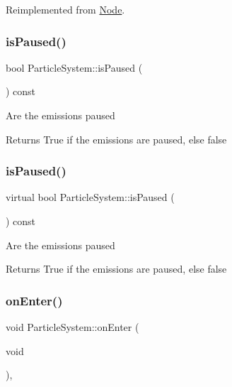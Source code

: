 Reimplemented from \hyperlink{classNode_ae6ce32d2088e2bb3426608334f1091c5}{Node}.

\mbox{\label{classParticleSystem_a330fdcb2d5d8e035e6955c8105c52659}} 
\subsubsection{\texorpdfstring{is\+Paused()}{isPaused()}\hspace{0.1cm}{\footnotesize\ttfamily [1/2]}}
{\footnotesize\ttfamily bool Particle\+System\+::is\+Paused (\begin{DoxyParamCaption}{ }\end{DoxyParamCaption}) const\hspace{0.3cm}{\ttfamily [virtual]}}

Are the emissions paused \begin{DoxyReturn}{Returns}
True if the emissions are paused, else false 
\end{DoxyReturn}
\mbox{\label{classParticleSystem_a5a829fd9224d4dbaa29ed79d6a1d5f29}} 
\subsubsection{\texorpdfstring{is\+Paused()}{isPaused()}\hspace{0.1cm}{\footnotesize\ttfamily [2/2]}}
{\footnotesize\ttfamily virtual bool Particle\+System\+::is\+Paused (\begin{DoxyParamCaption}{ }\end{DoxyParamCaption}) const\hspace{0.3cm}{\ttfamily [virtual]}}

Are the emissions paused \begin{DoxyReturn}{Returns}
True if the emissions are paused, else false 
\end{DoxyReturn}
\mbox{\label{classParticleSystem_a0bf785c1b1b386e0175fd01405072ab3}} 
\subsubsection{\texorpdfstring{on\+Enter()}{onEnter()}\hspace{0.1cm}{\footnotesize\ttfamily [1/2]}}
{\footnotesize\ttfamily void Particle\+System\+::on\+Enter (\begin{DoxyParamCaption}\item[{void}]{ }\end{DoxyParamCaption})\hspace{0.3cm}{\ttfamily [override]}, {\ttfamily [virtual]}}

